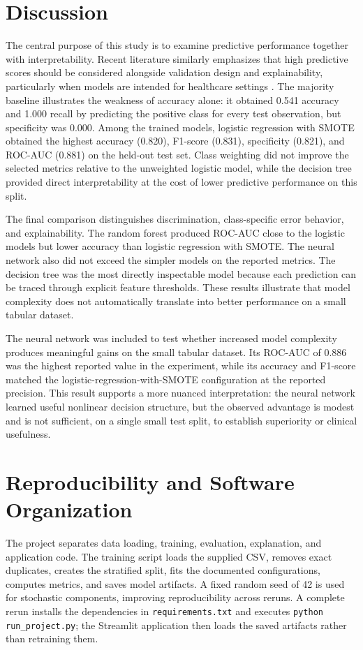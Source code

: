 \documentclass[10pt]{article}
\begin{document}
\section{Discussion}
The central purpose of this study is to examine predictive performance together with interpretability. Recent literature similarly emphasizes that high predictive scores should be considered alongside validation design and explainability, particularly when models are intended for healthcare settings \citep{alshaikh2024comprehensive,sreeja2024explainability,ganie2025ensemble,cenitta2026xai}. The majority baseline illustrates the weakness of accuracy alone: it obtained 0.541 accuracy and 1.000 recall by predicting the positive class for every test observation, but specificity was 0.000. Among the trained models, logistic regression with SMOTE obtained the highest accuracy (0.820), F1-score (0.831), specificity (0.821), and ROC-AUC (0.881) on the held-out test set. Class weighting did not improve the selected metrics relative to the unweighted logistic model, while the decision tree provided direct interpretability at the cost of lower predictive performance on this split.

The final comparison distinguishes discrimination, class-specific error behavior, and explainability. The random forest produced ROC-AUC close to the logistic models but lower accuracy than logistic regression with SMOTE. The neural network also did not exceed the simpler models on the reported metrics. The decision tree was the most directly inspectable model because each prediction can be traced through explicit feature thresholds. These results illustrate that model complexity does not automatically translate into better performance on a small tabular dataset.

The neural network was included to test whether increased model complexity produces meaningful gains on the small tabular dataset. Its ROC-AUC of 0.886 was the highest reported value in the experiment, while its accuracy and F1-score matched the logistic-regression-with-SMOTE configuration at the reported precision. This result supports a more nuanced interpretation: the neural network learned useful nonlinear decision structure, but the observed advantage is modest and is not sufficient, on a single small test split, to establish superiority or clinical usefulness.

\section{Reproducibility and Software Organization}
The project separates data loading, training, evaluation, explanation, and application code. The training script loads the supplied CSV, removes exact duplicates, creates the stratified split, fits the documented configurations, computes metrics, and saves model artifacts. A fixed random seed of 42 is used for stochastic components, improving reproducibility across reruns. A complete rerun installs the dependencies in \texttt{requirements.txt} and executes \texttt{python run\_project.py}; the Streamlit application then loads the saved artifacts rather than retraining them.
\end{document}
